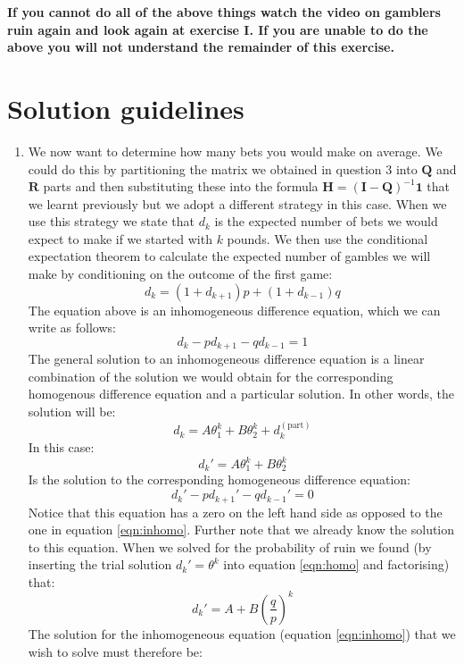\documentclass[paper=a4, fontsize=11pt]{scrartcl}
\numberwithin{equation}{section}
\numberwithin{figure}{section}
\numberwithin{table}{section}
\begin{document}
{\bf If you cannot do all of the above things watch the video on gamblers ruin again and look again at exercise I.  If you are unable to do the above you will not understand the remainder of this 
exercise.}

\section*{Solution guidelines}

\begin{enumerate}
 \item We now want to determine how many bets you would make on average.  We could do this by partitioning the matrix we obtained in question 3 into $\mathbf{Q}$ and $\mathbf{R}$ 
parts and then substituting these into the formula $\mathbf{H} = (\mathbf{I} - \mathbf{Q})^{-1} \mathbf{1}$ that we learnt previously but we adopt a different strategy in this case.   When 
we use this strategy we state that $d_k$ is the expected number of bets we would expect to make if we started with $k$ pounds.  We then use the conditional expectation theorem to calculate the 
expected number of gambles we will make by conditioning on the outcome of the first game:
\[
 d_k = (1+d_{k+1})p + (1 + d_{k-1})q
\]
The equation above is an inhomogeneous difference equation, which we can write as follows:
\begin{equation}
 d_k - pd_{k+1} - qd_{k-1} = 1
 \label{eqn:inhomo}
\end{equation}
The general solution to an inhomogeneous difference equation is a linear combination of the solution we would obtain for the corresponding homogenous difference equation and a particular 
solution.  In other words, the solution will be:
\[
d_k =  A \theta_1^k + B \theta_2^k + d^{(\textrm{part})}_k %
\]
In this case:
$$
d_k' = A \theta_1^k + B \theta_2^k
$$
Is the solution to the corresponding homogeneous difference equation:
\begin{equation}
d_k' - pd_{k+1}' - qd_{k-1}' = 0
\label{eqn:homo}
\end{equation}
Notice that this equation has a zero on the left hand side as opposed to the one in equation \ref{eqn:inhomo}.  Further note that we already know the solution to this equation.  When we solved for 
the probability of ruin we found (by inserting the trial solution $d_k' = \theta^k$ into equation \ref{eqn:homo} and factorising) that:
$$
d_k' = A + B \left( \frac{q}{p} \right)^k
$$
The solution for the inhomogeneous equation (equation \ref{eqn:inhomo}) that we wish to solve must therefore be:

\end{enumerate}
\end{document}
